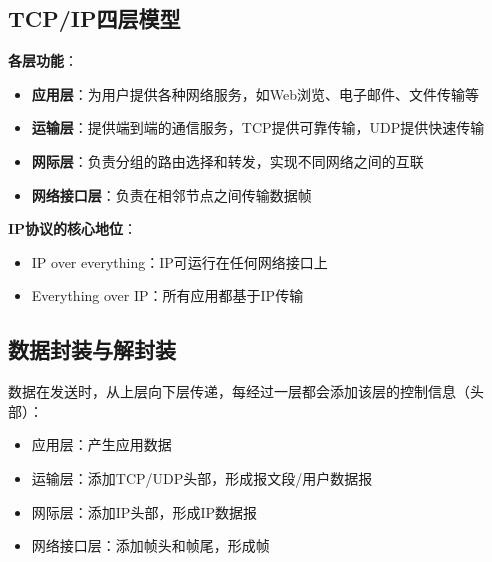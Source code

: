 \subsection{TCP/IP四层模型}
\begin{center}
\end{center}

\textbf{各层功能}：
\begin{itemize}[leftmargin=2em,itemsep=0pt]
    \item \textbf{应用层}：为用户提供各种网络服务，如Web浏览、电子邮件、文件传输等
    \item \textbf{运输层}：提供端到端的通信服务，TCP提供可靠传输，UDP提供快速传输
    \item \textbf{网际层}：负责分组的路由选择和转发，实现不同网络之间的互联
    \item \textbf{网络接口层}：负责在相邻节点之间传输数据帧
\end{itemize}

\begin{notebox}
\textbf{IP协议的核心地位}：
\begin{itemize}[itemsep=0pt]
    \item IP over everything：IP可运行在任何网络接口上
    \item Everything over IP：所有应用都基于IP传输
\end{itemize}
\end{notebox}

\subsection{数据封装与解封装}
数据在发送时，从上层向下层传递，每经过一层都会添加该层的控制信息（头部）：
\begin{itemize}[leftmargin=2em,itemsep=0pt]
    \item 应用层：产生应用数据
    \item 运输层：添加TCP/UDP头部，形成报文段/用户数据报
    \item 网际层：添加IP头部，形成IP数据报
    \item 网络接口层：添加帧头和帧尾，形成帧
\end{itemize}

